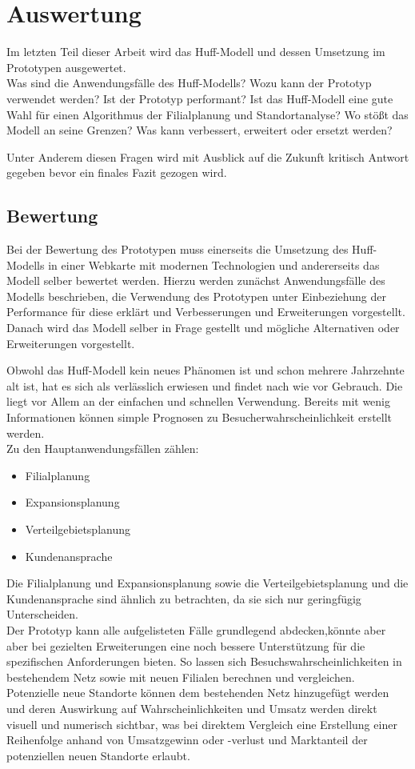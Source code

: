 \chapter{Auswertung}
Im letzten Teil dieser Arbeit wird das Huff-Modell und dessen Umsetzung im Prototypen ausgewertet.\\
Was sind die Anwendungsfälle des Huff-Modells?
Wozu kann der Prototyp verwendet werden?
Ist der Prototyp performant?
Ist das Huff-Modell eine gute Wahl für einen Algorithmus der Filialplanung und Standortanalyse?
Wo stößt das Modell an seine Grenzen?
Was kann verbessert, erweitert oder ersetzt werden?

Unter Anderem diesen Fragen wird mit Ausblick auf die Zukunft kritisch Antwort gegeben bevor ein finales Fazit gezogen wird.

\section{Bewertung}
\label{sec:bewertung}
Bei der Bewertung des Prototypen muss einerseits die Umsetzung des Huff-Modells in einer Webkarte mit modernen Technologien und andererseits das Modell selber bewertet werden.
Hierzu werden zunächst Anwendungsfälle des Modells beschrieben, die Verwendung des Prototypen unter Einbeziehung der Performance für diese erklärt und Verbesserungen und Erweiterungen vorgestellt.
Danach wird das Modell selber in Frage gestellt und mögliche Alternativen oder Erweiterungen vorgestellt.

Obwohl das Huff-Modell kein neues Phänomen ist und schon mehrere Jahrzehnte alt ist, hat es sich als verlässlich erwiesen und findet nach wie vor Gebrauch.
Die liegt vor Allem an der einfachen und schnellen Verwendung. 
Bereits mit wenig Informationen können simple Prognosen zu Besucherwahrscheinlichkeit erstellt werden.\\
Zu den Hauptanwendungsfällen zählen:

\begin{itemize}
	\item Filialplanung
	\item Expansionsplanung
	\item Verteilgebietsplanung
	\item Kundenansprache
\end{itemize}

Die Filialplanung und Expansionsplanung sowie die Verteilgebietsplanung und die Kundenansprache sind ähnlich zu betrachten, da sie sich nur geringfügig Unterscheiden.\\
Der Prototyp kann alle aufgelisteten Fälle grundlegend abdecken,könnte aber aber bei gezielten Erweiterungen eine noch bessere Unterstützung für die spezifischen Anforderungen bieten.
So lassen sich Besuchswahrscheinlichkeiten in bestehendem Netz sowie mit neuen Filialen berechnen und vergleichen.
Potenzielle neue Standorte können dem bestehenden Netz hinzugefügt werden und deren Auswirkung auf Wahrscheinlichkeiten und Umsatz werden direkt visuell und numerisch sichtbar, was bei direktem Vergleich eine Erstellung einer Reihenfolge anhand von Umsatzgewinn oder -verlust und Marktanteil der potenziellen neuen Standorte erlaubt.\\ 

